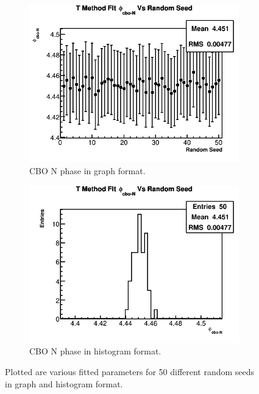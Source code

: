 \begin{figure}[]
	   	\vspace{4mm}
	   	\begin{subfigure}[t]{0.45\textwidth}
		    \centering
			\includegraphics[width=\textwidth]{TMethod_phi_cbo-N_Vs_Iter_Canv}
		    \caption{CBO N phase in graph format.}
	    \end{subfigure}
	    \hspace{4mm}
	    \begin{subfigure}[t]{0.45\textwidth}
		    \centering
			\includegraphics[width=\textwidth]{TMethod_phi_cbo-N_Vs_Iter_Canv_hist}
		    \caption{CBO N phase in histogram format.}
	    \end{subfigure}%
	\caption[TMethodRandomSeedsPars4]{Plotted are various fitted parameters for 50 different random seeds in graph and histogram format.}
	\label{fig:TMethodRandomSeedsPars4}
	\end{figure}
		
